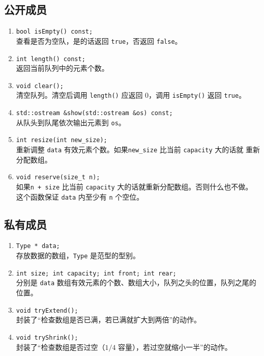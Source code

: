 {
\subsection{公开成员}
\begin{enumerate}
    \item \lstinline{bool isEmpty() const;} \\
          查看是否为空队，是的话返回 \lstinline{true}，否返回 \lstinline{false}。
    \item \lstinline{int length() const;} \\
          返回当前队列中的元素个数。
    \item \lstinline{void clear();} \\
          清空队列。清空后调用 \lstinline{length()} 应返回 0，调用 \lstinline{isEmpty()} 返回 \lstinline{true}。
    \item \lstinline{std::ostream &show(std::ostream &os) const;} \\
          从队头到队尾依次输出元素到 \lstinline{os}。
    \item \lstinline{int resize(int new_size);} \\
          重新调整 \lstinline{data} 有效元素个数。如果\lstinline{new_size} 比当前 \lstinline{capacity} 大的话就%
          重新分配数组。
    \item \lstinline{void reserve(size_t n);} \\
          如果\lstinline{n + size} 比当前 \lstinline{capacity} 大的话就重新分配数组。否则什么也不做。%
          这个函数保证 \lstinline{data} 内至少有 \lstinline{n} 个空位。
\end{enumerate}

\subsection{私有成员}
\begin{enumerate}
    \item \lstinline{Type * data;} \\
          存放数据的数组，\lstinline{Type} 是范型的型别。
    \item \lstinline{int size; int capacity; int front; int rear;} \\
          分别是 \lstinline{data} 数组有效元素的个数、数组大小，队列之头的位置，队列之尾的位置。\\
    \item \lstinline{void tryExtend();} \\
          封装了“检查数组是否已满，若已满就扩大到两倍”的动作。
    \item \lstinline{void tryShrink();} \\
          封装了“检查数组是否过空（$1/4$ 容量），若过空就缩小一半”的动作。
\end{enumerate}
}

